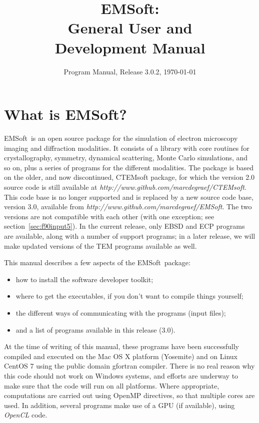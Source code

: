 \documentclass[DIV=calc, paper=letter, fontsize=11pt]{scrartcl}	 %
\title{EMSoft:\\ General User and\\ Development Manual} %
\author{\vspace*{-0.7in}} %
\date{Program Manual, Release 3.0.2, \today}
\newcommand{\ctp}{\textsf{EMSoft}}
\newcommand{\ctpb}{\textbf{\textsf{EMSoft}}}
\begin{document}
\maketitle

\renewcommand{\contentsname}{Table of Contents}
{\small\tableofcontents}

\newpage
\section{What is \ctpb?}
\ctp\ is an open source package for the simulation of electron microscopy imaging and diffraction modalities.  It consists of a library with
core routines for crystallography, symmetry, dynamical scattering, Monte Carlo simulations, and so on, plus a series of programs for the different modalities.
The package is based on the older, and now discontinued, \textsf{CTEMsoft} package, for which the version 2.0 source code is still
available at \textit{http://www.github.com/marcdegraef/CTEMsoft}.  This code base is no longer supported and is replaced
by a new source code base, version 3.0, available from \textit{http://www.github.com/marcdegraef/EMSoft}.  The two versions are not 
compatible with each other (with one exception; see section~\ref{sec:f90input5}).  In the current release, only EBSD and ECP programs are
available, along with a number of support programs; in a later release, we will make updated versions of the TEM programs available as well.

This manual describes a few aspects of the \ctp\ package:
\begin{itemize}
\item how to install the software developer toolkit;
\item where to get the executables, if you don't want to compile things yourself;
\item the different ways of communicating with the programs (input files);
\item and a list of programs available in this release (3.0).
\end{itemize}

At the time of writing of this manual, these programs have been successfully compiled and executed on the Mac OS X platform (Yosemite) and on 
Linux CentOS 7 using the public domain gfortran compiler. There is no real reason why this code should not work on Windows systems, and efforts are underway
to make sure that the code will run on all platforms. Where appropriate, computations
are carried out using \textsf{OpenMP} directives, so that multiple cores are used.  In addition, several programs make use of a 
GPU (if available), using \textit{OpenCL} code.
\end{document}
